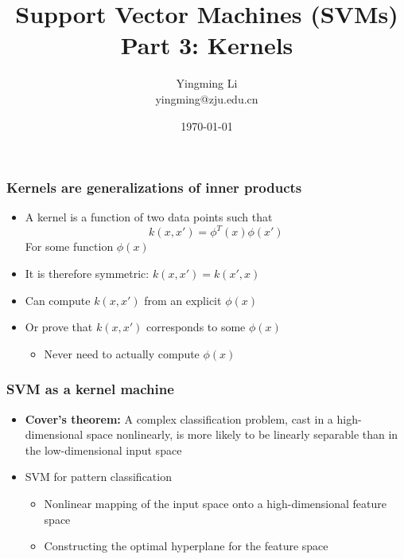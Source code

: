 \documentclass[12pt,notes,mathserif]{beamer}
\title{Support Vector Machines (SVMs) \\Part 3: Kernels}
\author[YingmingLi]{Yingming Li \\ yingming@zju.edu.cn}
\institute[DSERC, ZJU]{Data Science \& Engineering Research Center, ZJU}
\date[\today]{\today}
\begin{document}

\begin{frame}[c]
	\titlepage
\end{frame}

\begin{frame}[c]
\frametitle{Kernels are generalizations of inner products}
\begin{itemize}
\item A kernel is a function of two data points such that
\[
k(x,x')=\phi^T(x)\phi(x')
\]
For some function $\phi(x)$
\item It is therefore symmetric: $k(x,x')=k(x',x)$
\item Can compute $k(x,x')$ from an explicit $\phi(x)$
\item Or prove that $k(x,x')$ corresponds to some $\phi(x)$
\begin{itemize}
\item Never need to actually compute $\phi(x)$
\end{itemize}
\end{itemize}

\end{frame}


\begin{frame}[c]
\frametitle{SVM as a kernel machine}
\begin{itemize}
\item {\bf Cover's theorem:} A complex classification problem, cast in a high-dimensional space nonlinearly, is more likely to be linearly separable than in the low-dimensional input space

\item SVM for pattern classification
\begin{itemize}
\item Nonlinear mapping of the input space onto a high-dimensional feature space
\item Constructing the optimal hyperplane for the feature space
\end{itemize}

\end{itemize}
\end{frame}
\end{document}
